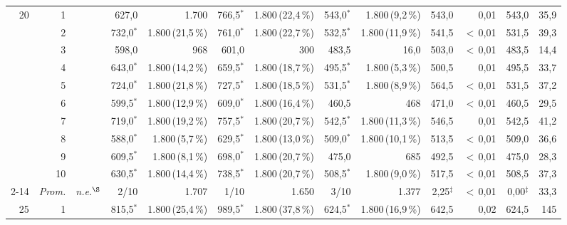 \documentclass[11pt,a4paper]{article}
\begin{document}
\begin{table}[htbp]
{\begin{tabular}{rr rr rr rr rr rr rr}
\midrule
20 & 1 &  &  & 627{,}0 & 1.700 & 766{,}5$^{*}$ & 1.800\,{\scriptsize(22{,}4\,\%)} & 543{,}0$^{*}$ & 1.800\,{\scriptsize(9{,}2\,\%)} & 543{,}0 & 0{,}01 & 543{,}0 & 35{,}9 \\
 & 2 &  &  & 732{,}0$^{*}$ & 1.800\,{\scriptsize(21{,}5\,\%)} & 761{,}0$^{*}$ & 1.800\,{\scriptsize(22{,}7\,\%)} & 532{,}5$^{*}$ & 1.800\,{\scriptsize(11{,}9\,\%)} & 541{,}5 & $<$\,0{,}01 & 531{,}5 & 39{,}3 \\
 & 3 &  &  & 598{,}0 & 968 & 601{,}0 & 300 & 483{,}5 & 16{,}0 & 503{,}0 & $<$\,0{,}01 & 483{,}5 & 14{,}4 \\
 & 4 &  &  & 643{,}0$^{*}$ & 1.800\,{\scriptsize(14{,}2\,\%)} & 659{,}5$^{*}$ & 1.800\,{\scriptsize(18{,}7\,\%)} & 495{,}5$^{*}$ & 1.800\,{\scriptsize(5{,}3\,\%)} & 500{,}5 & 0{,}01 & 495{,}5 & 33{,}7 \\
 & 5 &  &  & 724{,}0$^{*}$ & 1.800\,{\scriptsize(21{,}8\,\%)} & 727{,}5$^{*}$ & 1.800\,{\scriptsize(18{,}5\,\%)} & 531{,}5$^{*}$ & 1.800\,{\scriptsize(8{,}9\,\%)} & 564{,}5 & $<$\,0{,}01 & 531{,}5 & 37{,}2 \\
 & 6 &  &  & 599{,}5$^{*}$ & 1.800\,{\scriptsize(12{,}9\,\%)} & 609{,}0$^{*}$ & 1.800\,{\scriptsize(16{,}4\,\%)} & 460{,}5 & 468 & 471{,}0 & $<$\,0{,}01 & 460{,}5 & 29{,}5 \\
 & 7 &  &  & 719{,}0$^{*}$ & 1.800\,{\scriptsize(19{,}2\,\%)} & 757{,}5$^{*}$ & 1.800\,{\scriptsize(20{,}7\,\%)} & 542{,}5$^{*}$ & 1.800\,{\scriptsize(11{,}3\,\%)} & 546{,}5 & 0{,}01 & 542{,}5 & 41{,}2 \\
 & 8 &  &  & 588{,}0$^{*}$ & 1.800\,{\scriptsize(5{,}7\,\%)} & 629{,}5$^{*}$ & 1.800\,{\scriptsize(13{,}0\,\%)} & 509{,}0$^{*}$ & 1.800\,{\scriptsize(10{,}1\,\%)} & 513{,}5 & $<$\,0{,}01 & 509{,}0 & 36{,}6 \\
 & 9 &  &  & 609{,}5$^{*}$ & 1.800\,{\scriptsize(8{,}1\,\%)} & 698{,}0$^{*}$ & 1.800\,{\scriptsize(20{,}7\,\%)} & 475{,}0 & 685 & 492{,}5 & $<$\,0{,}01 & 475{,}0 & 28{,}3 \\
 & 10 &  &  & 630{,}5$^{*}$ & 1.800\,{\scriptsize(14{,}4\,\%)} & 738{,}5$^{*}$ & 1.800\,{\scriptsize(20{,}7\,\%)} & 508{,}5$^{*}$ & 1.800\,{\scriptsize(9{,}0\,\%)} & 517{,}5 & $<$\,0{,}01 & 508{,}5 & 37{,}3 \\
\cmidrule(l){2-14}
 & \emph{Prom.} & \multicolumn{2}{c}{\textit{n.e.}$^{\S}$} & 2/10 & 1.707 & 1/10 & 1.650 & 3/10 & 1.377 & 2{,}25$^{\ddagger}$ & $<$\,0{,}01 & 0{,}00$^{\ddagger}$ & 33{,}3 \\
\midrule
25 & 1 &  &  & 815{,}5$^{*}$ & 1.800\,{\scriptsize(25{,}4\,\%)} & 989{,}5$^{*}$ & 1.800\,{\scriptsize(37{,}8\,\%)} & 624{,}5$^{*}$ & 1.800\,{\scriptsize(16{,}9\,\%)} & 642{,}5 & 0{,}02 & 624{,}5 & 145 \\

\end{tabular}}
\end{table}
\end{document}
